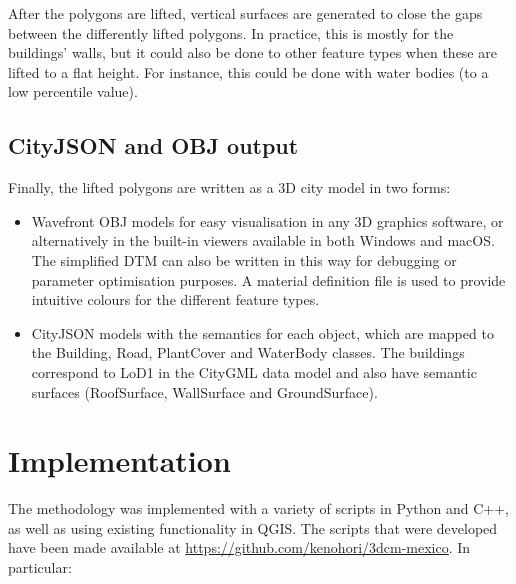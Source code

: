 \documentclass{isprs} %
\begin{document}
After the polygons are lifted, vertical surfaces are generated to close the gaps between the differently lifted polygons.
In practice, this is mostly for the buildings' walls, but it could also be done to other feature types when these are lifted to a flat height.
For instance, this could be done with water bodies (to a low percentile value).

\subsection{CityJSON and OBJ output}

Finally, the lifted polygons are written as a 3D city model in two forms:

\begin{itemize}
    \item Wavefront OBJ models for easy visualisation in any 3D graphics software, or alternatively in the built-in viewers available in both Windows and macOS. The simplified DTM can also be written in this way for debugging or parameter optimisation purposes. A material definition file is used to provide intuitive colours for the different feature types.
    \item CityJSON \citep{Ledoux19} models with the semantics for each object, which are mapped to the Building, Road, PlantCover and WaterBody classes. The buildings correspond to LoD1 in the CityGML data model \citep{citygml2021ogc} and also have semantic surfaces (RoofSurface, WallSurface and GroundSurface). 
\end{itemize}

\section{Implementation}
\label{sec:implementation}

The methodology was implemented with a variety of scripts in Python and C++, as well as using existing functionality in QGIS.
The scripts that were developed have been made available at \url{https://github.com/kenohori/3dcm-mexico}.
In particular:
\end{document}
